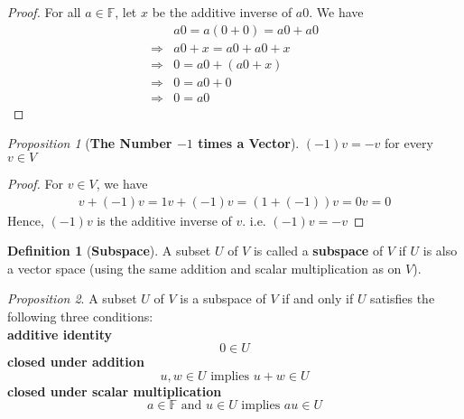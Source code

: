 \documentclass[paper=a4, fontsize=11pt]{scrartcl}
\numberwithin{equation}{section}		%
\numberwithin{figure}{section}			%
\numberwithin{table}{section}				%
\theoremstyle{definition}
\newtheorem{definition}{Definition}[section]
\theoremstyle{remark}
\theoremstyle{example}
\newtheorem{prop}{Proposition}[section]
\begin{document}
\begin{proof}
    For all $a \in \mathbb{F}$, let $x$ be the additive inverse of $a0$. We have
    \begin{equation}
        \begin{aligned}
            &a0 = a(0 + 0) = a0 + a0\\
            \Rightarrow &a0 + x = a0 + a0 + x\\
            \Rightarrow &0 = a0 + (a0 + x)\\
            \Rightarrow &0 = a0 + 0\\
            \Rightarrow &0 = a0
        \end{aligned}
    \end{equation}
\end{proof}

\begin{prop}[\textbf{The Number $-1$ times a Vector}]
    $(-1)v = -v$ for every $v \in V$
\end{prop}

\begin{proof}
    For $v \in V$, we have
    \begin{equation}
        \begin{aligned}
            v + (-1)v = 1v + (-1)v = (1+(-1))v = 0v = 0
        \end{aligned}
    \end{equation}
    Hence, $(-1)v$ is the additive inverse of $v$. i.e. $(-1)v = -v$
\end{proof}

\begin{definition}[\textbf{Subspace}]
    A subset $U$ of $V$ is called a \textbf{subspace} of $V$ if $U$ is also a vector space (using the same addition and scalar multiplication as on $V$).
\end{definition}

\begin{prop}
    A subset $U$ of $V$ is a subspace of $V$ if and only if $U$ satisfies the following three conditions:\\
    \textbf{additive identity}
    \begin{equation}
        0 \in U
    \end{equation}
    \textbf{closed under addition}
    \begin{equation}
        u,w \in U \text{ implies } u + w \in U
    \end{equation}
    \textbf{closed under scalar multiplication}
    \begin{equation}
        a \in \mathbb{F} \text{ and } u \in U \text{ implies } au \in U
    \end{equation}
\end{prop}
\end{document}
